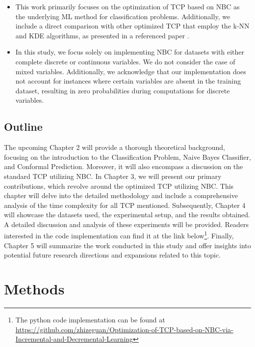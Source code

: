 \documentclass[10pt]{reportMaster}
\begin{document}
\begin{itemize}

\item This work primarily focuses on the optimization of TCP based on NBC as the underlying ML method for classification problems. Additionally, we include a direct comparison with other optimized TCP that employ the k-NN and KDE algorithms, as presented in a referenced paper \cite{cherubin2021exact}.

\item In this study, we focus solely on implementing NBC for datasets with either complete discrete or continuous variables. We do not consider the case of mixed variables. Additionally, we acknowledge that our implementation does not account for instances where certain variables are absent in the training dataset, resulting in zero probabilities during computations for discrete variables.

\end{itemize}

\section{Outline}

The upcoming Chapter 2 will provide a thorough theoretical background, focusing on the introduction to the Classification Problem, Naive Bayes Classifier, and Conformal Prediction. Moreover, it will also encompass a discussion on the standard TCP utilizing NBC. In Chapter 3, we will present our primary contributions, which revolve around the optimized TCP utilizing NBC. This chapter will delve into the detailed methodology and include a comprehensive analysis of the time complexity for all TCP mentioned. Subsequently, Chapter 4 will showcase the datasets used, the experimental setup, and the results obtained. A detailed discussion and analysis of these experiments will be provided. Readers interested in the code implementation can find it at the link below\footnote[1]{The python code implementation can be found at \url{https://github.com/zhizeguan/Optimization-of-TCP-based-on-NBC-via-Incremental-and-Decremental-Learning}}. Finally, Chapter 5 will summarize the work conducted in this study and offer insights into potential future research directions and expansions related to this topic.

\chapter{Methods}
\end{document}
